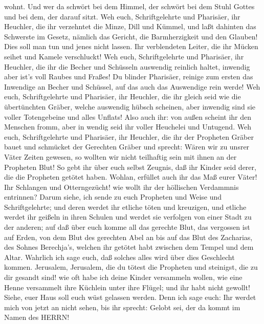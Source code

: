 wohnt.  Und wer da schwört bei dem Himmel, der schwört bei
dem Stuhl Gottes und bei dem, der darauf sitzt.  Weh euch,
Schriftgelehrte und Pharisäer, ihr Heuchler, die ihr verzehntet die
Minze, Dill und Kümmel, und laßt dahinten das Schwerste im Gesetz,
nämlich das Gericht, die Barmherzigkeit und den Glauben! Dies soll man
tun und jenes nicht lassen.  Ihr verblendeten Leiter, die
ihr Mücken seihet und Kamele verschluckt!  Weh euch,
Schriftgelehrte und Pharisäer, ihr Heuchler, die ihr die Becher und
Schüsseln auswendig reinlich haltet, inwendig aber ist's voll Raubes und
Fraßes!  Du blinder Pharisäer, reinige zum ersten das
Inwendige an Becher und Schüssel, auf das auch das Auswendige rein
werde!  Weh euch, Schriftgelehrte und Pharisäer, ihr
Heuchler, die ihr gleich seid wie die übertünchten Gräber, welche
auswendig hübsch scheinen, aber inwendig sind sie voller Totengebeine
und alles Unflats!  Also auch ihr: von außen scheint ihr
den Menschen fromm, aber in wendig seid ihr voller Heuchelei und
Untugend.  Weh euch, Schriftgelehrte und Pharisäer, ihr
Heuchler, die ihr der Propheten Gräber bauet und schmücket der Gerechten
Gräber  und sprecht: Wären wir zu unsrer Väter Zeiten
gewesen, so wollten wir nicht teilhaftig sein mit ihnen an der Propheten
Blut!  So gebt ihr über euch selbst Zeugnis, daß ihr Kinder
seid derer, die die Propheten getötet haben.  Wohlan,
erfüllet auch ihr das Maß eurer Väter!  Ihr Schlangen und
Otterngezücht! wie wollt ihr der höllischen Verdammnis entrinnen?
 Darum siehe, ich sende zu euch Propheten und Weise und
Schriftgelehrte; und deren werdet ihr etliche töten und kreuzigen, und
etliche werdet ihr geißeln in ihren Schulen und werdet sie verfolgen von
einer Stadt zu der anderen;  auf daß über euch komme all
das gerechte Blut, das vergossen ist auf Erden, von dem Blut des
gerechten Abel an bis auf das Blut des Zacharias, des Sohnes Berechja's,
welchen ihr getötet habt zwischen dem Tempel und dem Altar.
 Wahrlich ich sage euch, daß solches alles wird über dies
Geschlecht kommen.  Jerusalem, Jerusalem, die du tötest die
Propheten und steinigst, die zu dir gesandt sind! wie oft habe ich deine
Kinder versammeln wollen, wie eine Henne versammelt ihre Küchlein unter
ihre Flügel; und ihr habt nicht gewollt!  Siehe, euer Haus
soll euch wüst gelassen werden.  Denn ich sage euch: Ihr
werdet mich von jetzt an nicht sehen, bis ihr sprecht: Gelobt sei, der
da kommt im Namen des HERRN!

